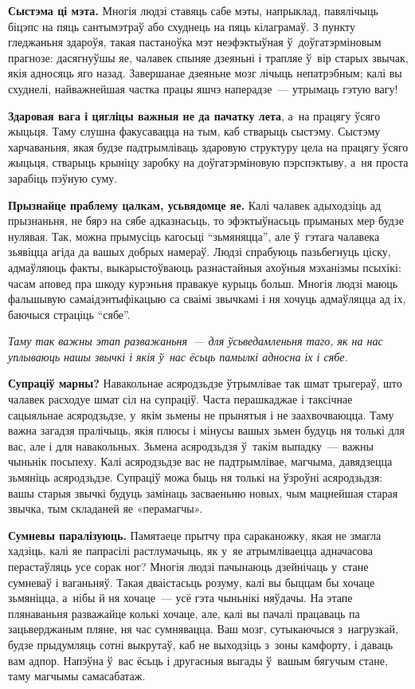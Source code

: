 \textbf{Сыстэма ці мэта.} Многія людзі ставяць сабе мэты, напрыклад, павялічыць біцэпс на пяць сантымэтраў або схуднець на пяць кілаграмаў. З пункту гледжаньня здароўя, такая пастаноўка мэт неэфэктыўная ў~доўгатэрміновым прагнозе: дасягнуўшы яе, чалавек спыняе дзеяньні і трапляе ў~вір старых звычак, якія адносяць яго назад. Завершанае дзеяньне мозг лічыць непатрэбным; калі вы схуднелі, найважнейшая частка працы яшчэ наперадзе~--- утрымаць гэтую вагу! 

\textbf{Здаровая вага і цягліцы важныя не да пачатку лета}, а~на працягу ўсяго жыцьця. Таму слушна факусавацца на тым, каб стварыць сыстэму. Сыстэму харчаваньня, якая будзе падтрымліваць здаровую структуру цела на працягу ўсяго жыцьця, стварыць крыніцу заробку на доўгатэрміновую пэрспэктыву, а~ня проста зарабіць пэўную суму.

\textbf{Прызнайце праблему цалкам, усьвядомце яе.} Калі чалавек адыходзіць ад прызнаньня, не бярэ на сябе адказнасьць, то эфэктыўнасьць прыманых мер будзе нулявая. Так, можна прымусіць кагосьці ``зьмяняцца'', але ў~гэтага чалавека зьявіцца агіда да вашых добрых намераў. Людзі спрабуюць пазьбегнуць ціску, адмаўляюць факты, выкарыстоўваюць разнастайныя ахоўныя мэханізмы псыхікі: часам аповед пра шкоду курэньня правакуе курыць больш. Многія людзі маюць фальшывую самаідэнтыфікацыю са сваімі звычкамі і ня хочуць адмаўляцца ад іх, баючыся страціць ``сябе''.

\emph{Таму так важны этап разважаньня~--- для ўсьведамленьня таго, як на нас уплываюць нашы звычкі і якія ў~нас ёсьць памылкі адносна іх і сябе.}

\textbf{Супраціў марны?} Навакольнае асяродзьдзе ўтрымлівае так шмат трыгераў, што чалавек расходуе шмат сіл на супраціў. Часта перашкаджае і таксічнае сацыяльнае асяродзьдзе, у~якім зьмены не прынятыя і не заахвочваюцца. Таму важна загадзя пралічыць, якія плюсы і мінусы вашых зьмен будуць ня толькі для вас, але і для навакольных. Зьмена асяродзьдзя ў~такім выпадку~--- важны чыньнік посьпеху. Калі асяродзьдзе вас не падтрымлівае, магчыма, давядзецца зьмяніць асяродзьдзе. Супраціў можа быць ня толькі на ўзроўні асяродзьдзя: вашы старыя звычкі будуць замінаць засваеньню новых, чым мацнейшая старая звычка, тым складаней яе «перамагчы».

\textbf{Сумневы паралізуюць.} Памятаеце прытчу пра сараканожку, якая не змагла хадзіць, калі яе папрасілі растлумачыць, як у~яе атрымліваецца адначасова перастаўляць усе сорак ног? Многія людзі пачынаюць дзейнічаць у~стане сумневаў і ваганьняў. Такая дваістасьць розуму, калі вы быццам бы хочаце зьмяніцца, а~нібы й ня хочаце~--- усё гэта чыньнікі няўдачы. На этапе плянаваньня разважайце колькі хочаце, але, калі вы пачалі працаваць па зацьверджаным пляне, ня час сумнявацца. Ваш мозг, сутыкаючыся з~нагрузкай, будзе прыдумляць сотні выкрутаў, каб не выходзіць з~зоны камфорту, і даваць вам адпор. Напэўна ў~вас ёсьць і другасныя выгады ў~вашым бягучым стане, таму магчымы самасабатаж.

